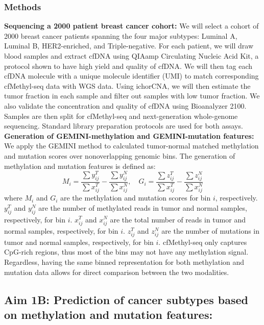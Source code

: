 \documentclass[11pt]{article}
\begin{document}
\subsubsection*{Methods}
\textbf{Sequencing a 2000 patient breast cancer cohort:}
We will select a cohort of 2000 breast cancer patients spanning the four major subtypes: Luminal A, Luminal B, HER2-enriched, and Triple-negative. For each patient, we 
will draw blood samples and extract cfDNA using QIAamp Circulating Nucleic Acid Kit,
a protocol shown to have high yield and quality of cfDNA. We will then tag each cfDNA molecule with a unique molecule identifier (UMI) to match corresponding cfMethyl-seq data with WGS data. 
Using ichorCNA, we will then estimate the tumor fraction in each sample and filter out samples with low tumor fraction. 
We also validate the concentration and quality of cfDNA using Bioanalyzer 2100.
Samples are then split for cfMethyl-seq and next-generation whole-genome sequencing. 
Standard library preparation protocols are used for both assays. 
\medskip \\ 
\textbf{Generation of GEMINI-methylation and GEMINI-mutation features:}
We apply the GEMINI method to calculated tumor-normal matched methylation and mutation
scores over nonoverlapping genomic bins.
The generation of methylation and mutation features is defined as:
\begin{equation}
	M_{i} = \frac{\sum{y^{T}_{ij}}}{\sum{x^{T}_{ij}}} - 
	\frac{\sum{y^{N}_{ij}}}{\sum{x^{N}_{ij}}},
	\quad
	G_{i} = \frac{\sum{z^{T}_{ij}}}{\sum{x^{T}_{ij}}} -
	\frac{\sum{z^{N}_{ij}}}{\sum{x^{N}_{ij}}}
\end{equation}
where $M_{i}$ and $G_{i}$ are the methylation and mutation scores for bin $i$, respectively. $y^{T}_{ij}$ and $y^{N}_{ij}$ are the number of methylated reads in tumor and normal samples, respectively, for bin $i$. $x^{T}_{ij}$ and $x^{N}_{ij}$ are the total number of reads in tumor and normal samples, respectively, for bin $i$. $z^{T}_{ij}$ and $z^{N}_{ij}$ are the number of mutations in tumor and normal samples, respectively, for bin $i$. cfMethyl-seq only captures CpG-rich regions, thus most of the bins 
may not have any methylation signal.
Regardless, having the same binned representation for both methylation and mutation data allows for direct comparison between the two modalities.

\subsection*{Aim 1B: Prediction of cancer subtypes based on methylation and mutation features:}
\end{document}
